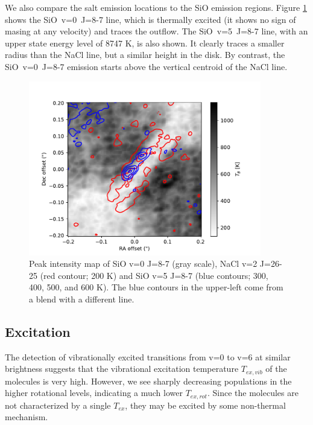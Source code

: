 \documentclass[twocolumn]{aastex62}
\begin{document}
We also compare the salt emission locations to the SiO emission regions.
Figure \ref{fig:sioonnacl} shows the \mbox{SiO v=0 J=8-7} line, which is
thermally excited (it shows no sign of masing at any velocity) and traces the
outflow.  The \mbox{SiO v=5 J=8-7} line, with an upper state energy level of
8747 K, is also shown.  It clearly traces a smaller radius than the NaCl line,
but a similar height in the disk.  By contrast, the \mbox{SiO v=0 J=8-7}
emission starts above the vertical centroid of the NaCl line.


\begin{figure}[!htp]
\includegraphics[scale=1,width=4in]{figures/SiO_8-7_on_NaClv=2_26-25.pdf}
\caption{Peak intensity map of SiO v=0 J=8-7 (gray scale), NaCl v=2 J=26-25
(red contour; 200 K) and {SiO v=5 J=8-7} (blue contours; 300, 400, 500, and 600
K).  The blue contours in the upper-left come from a blend with a different
line.
}
\label{fig:sioonnacl}
\end{figure}



\subsection{Excitation}
The detection of vibrationally excited transitions from v=0 to v=6 at similar
brightness suggests that the vibrational excitation temperature $T_{ex,vib}$ of
the molecules is very high.  However, we see sharply decreasing populations in
the higher rotational levels, indicating a much lower $T_{ex,rot}$.  Since the
molecules are not characterized by a single $T_{ex}$, they may be excited by
some non-thermal mechanism.
\end{document}
